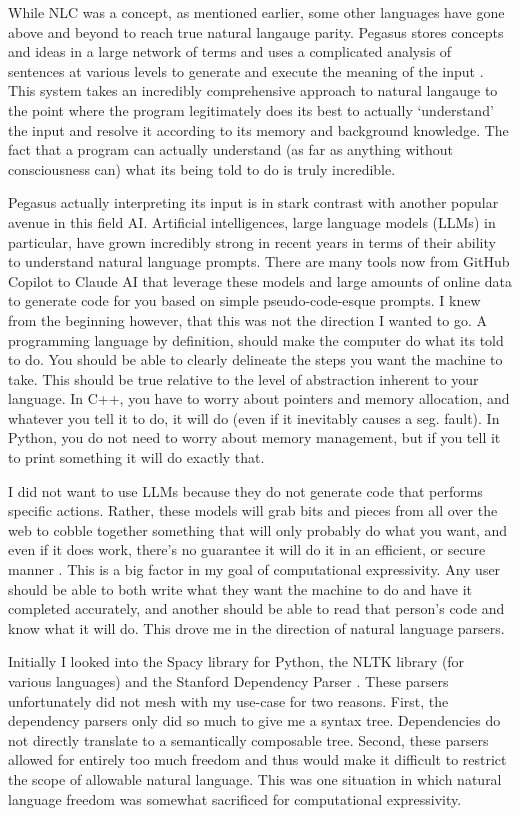 \documentclass[titlepage]{article}
\begin{document}
While NLC was a concept, as mentioned earlier, some other languages have gone above and beyond to reach true natural langauge parity. Pegasus stores concepts and ideas in a large network of terms and uses a complicated analysis of sentences at various levels to generate and execute the meaning of the input \cite{Knöll2006PegasusFS}. This system takes an incredibly comprehensive approach to natural langauge to the point where the program legitimately does its best to actually `understand' the input and resolve it according to its memory and background knowledge. The fact that a program can actually understand (as far as anything without consciousness can) what its being told to do is truly incredible.

Pegasus actually interpreting its input is in stark contrast with another popular avenue in this field AI. Artificial intelligences, large language models (LLMs) in particular, have grown incredibly strong in recent years in terms of their ability to understand natural language prompts. There are many tools now from GitHub Copilot to Claude AI that leverage these models and large amounts of online data to generate code for you based on simple pseudo-code-esque prompts. I knew from the beginning however, that this was not the direction I wanted to go. A programming language by definition, should make the computer do what its told to do. You should be able to clearly delineate the steps you want the machine to take. This should be true relative to the level of abstraction inherent to your language. In C++, you have to worry about pointers and memory allocation, and whatever you tell it to do, it will do (even if it inevitably causes a seg. fault). In Python, you do not need to worry about memory management, but if you tell it to print something it will do exactly that.

I did not want to use LLMs because they do not generate code that performs specific actions. Rather, these models will grab bits and pieces from all over the web to cobble together something that will only probably do what you want, and even if it does work, there's no guarantee it will do it in an efficient, or secure manner \cite{Fu2023SecurityWO}. This is a big factor in my goal of computational expressivity. Any user should be able to both write what they want the machine to do and have it completed accurately, and another should be able to read that person's code and know what it will do. This drove me in the direction of natural language parsers.

Initially I looked into the Spacy library for Python, the NLTK library (for various languages) and the Stanford Dependency Parser \cite{Marneffe2006GeneratingTD}. These parsers unfortunately did not mesh with my use-case for two reasons. First, the dependency parsers only did so much to give me a syntax tree. Dependencies do not directly translate to a semantically composable tree. Second, these parsers allowed for entirely too much freedom and thus would make it difficult to restrict the scope of allowable natural language. This was one situation in which natural language freedom was somewhat sacrificed for computational expressivity.
\end{document}
